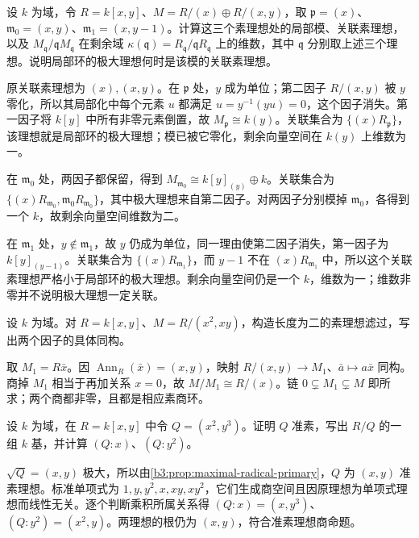 \begin{exercise}\label{b3:ex:04-localization-primes}
	设 \(k\) 为域，令 \(R=k[x,y]\)、\(M=R/(x)\oplus R/(x,y)\)，取 \(\mathfrak p=(x)\)、\(\mathfrak m_0=(x,y)\)、\(\mathfrak m_1=(x,y-1)\)。计算这三个素理想处的局部模、关联素理想，以及 \(M_{\mathfrak q}/\mathfrak qM_{\mathfrak q}\) 在剩余域 \(\kappa(\mathfrak q)=R_{\mathfrak q}/\mathfrak qR_{\mathfrak q}\) 上的维数，其中 \(\mathfrak q\) 分别取上述三个理想。说明局部环的极大理想何时是该模的关联素理想。
\end{exercise}
\begin{solution}
	原关联素理想为 \((x),(x,y)\)。在 \(\mathfrak p\) 处，\(y\) 成为单位；第二因子 \(R/(x,y)\) 被 \(y\) 零化，所以其局部化中每个元素 \(u\) 都满足 \(u=y^{-1}(yu)=0\)，这个因子消失。第一因子将 \(k[y]\) 中所有非零元素倒置，故 \(M_{\mathfrak p}\cong k(y)\)。关联集合为 \(\{(x)R_{\mathfrak p}\}\)，该理想就是局部环的极大理想；模已被它零化，剩余向量空间在 \(k(y)\) 上维数为一。

	在 \(\mathfrak m_0\) 处，两因子都保留，得到 \(M_{\mathfrak m_0}\cong k[y]_{(y)}\oplus k\)。关联集合为 \(\{(x)R_{\mathfrak m_0},\mathfrak m_0R_{\mathfrak m_0}\}\)，其中极大理想来自第二因子。对两因子分别模掉 \(\mathfrak m_0\)，各得到一个 \(k\)，故剩余向量空间维数为二。

	在 \(\mathfrak m_1\) 处，\(y\notin\mathfrak m_1\)，故 \(y\) 仍成为单位，同一理由使第二因子消失，第一因子为 \(k[y]_{(y-1)}\)。关联集合为 \(\{(x)R_{\mathfrak m_1}\}\)，而 \(y-1\) 不在 \((x)R_{\mathfrak m_1}\) 中，所以这个关联素理想严格小于局部环的极大理想。剩余向量空间仍是一个 \(k\)，维数为一；维数非零并不说明极大理想一定关联。
\end{solution}

\begin{exercise}\label{b3:ex:04-prime-filtration-explicit}
	设 \(k\) 为域。对 \(R=k[x,y]\)、\(M=R/(x^2,xy)\)，构造长度为二的素理想滤过，写出两个因子的具体同构。
\end{exercise}
\begin{solution}
	取 \(M_1=R\bar x\)。因 \(\operatorname{Ann}_R(\bar x)=(x,y)\)，映射 \(R/(x,y)\rightarrow M_1\)、\(\bar a\mapsto a\bar x\) 同构。商掉 \(M_1\) 相当于再加关系 \(x=0\)，故 \(M/M_1\cong R/(x)\)。链 \(0\subsetneq M_1\subsetneq M\) 即所求；两个商都非零，且都是相应素商环。
\end{solution}

\begin{exercise}\label{b3:ex:04-primary-colon-basis}
	设 \(k\) 为域，在 \(R=k[x,y]\) 中令 \(Q=(x^2,y^3)\)。证明 \(Q\) 准素，写出 \(R/Q\) 的一组 \(k\) 基，并计算 \((Q:x)\)、\((Q:y^2)\)。
\end{exercise}
\begin{solution}
	\(\sqrt Q=(x,y)\) 极大，所以由\cref{b3:prop:maximal-radical-primary}，\(Q\) 为 \((x,y)\) 准素理想。标准单项式为 \(1,y,y^2,x,xy,xy^2\)，它们生成商空间且因原理想为单项式理想而线性无关。逐个判断乘积所属关系得 \((Q:x)=(x,y^3)\)、\((Q:y^2)=(x^2,y)\)。两理想的根仍为 \((x,y)\)，符合准素理想商命题。
\end{solution}

